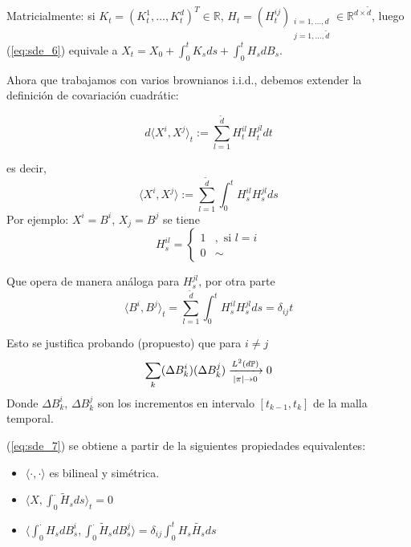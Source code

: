 Matricialmente: si $K_t = (K_t^1, \ldots, K_t^d)^T \in \mathbb{R}$, $H_t =
(H_t^{ij})_{\substack{i = 1,\ldots, d \\ j=1,\ldots,\tilde{d}}} \in \mathbb{R}^{d \times \tilde{d}}$, luego 
(\ref{eq:sde_6}) equivale a $X_t = X_0 + \int_{0}^{t} K_s ds + \int_{0}^{t} H_s dB_s$. 

Ahora que trabajamos con varios brownianos i.i.d., debemos extender la definición de covariación 
cuadrátic: 

\begin{equation*}
        d\langle X^{i}, X^{j} \rangle_t := \sum_{l=1}^{\tilde{d}} H_{t}^{il} H_{t}^{jl} dt
\end{equation*}

es decir, 
\begin{equation*}
        \label{eq:sde_7}        
        \tag{**}
\langle X^{i}, X^{j} \rangle := \sum_{l=1}^{\tilde{d}} \int_{0}^{t} H_{s}^{il} H_{s}^{jl} ds
\end{equation*}
 Por ejemplo: $X^i = B^i$, $X_j = B^j$ se tiene 
 \begin{equation*}
         H_{s}^{il} = 
         \begin{cases}
                 1 &, \text{ si } l=i \\
                 0 & \sim 
         \end{cases}
 \end{equation*}

Que opera de manera análoga para $H^{jl}_s$, por otra parte 
\begin{equation*}
        \langle B^i, B^j \rangle_t = \sum_{l=1}^{\tilde{d}} \int_{0}^{t} H_s^{il} H_s^{jl} ds = \delta_{ij} t 
\end{equation*}

Esto se justifica probando (propuesto) que para $i \neq j$ 
\begin{equation*}
        \sum_{k} (\Delta B_k^i)(\Delta B_k^j) \xrightarrow[\abs{\pi} \to 0]{L^2(d\mathbb{P})} 0
\end{equation*}
Donde $\Delta B_k^i$, $\Delta B_k^j$ son los incrementos en intervalo
$[t_{k-1}, t_{k}]$ de la malla temporal.

\begin{remark}
        (\ref{eq:sde_7}) se obtiene a partir de la siguientes propiedades equivalentes: 
        \begin{itemize}
                \item $\langle \cdot , \cdot  \rangle$ es bilineal y simétrica. 
                \item $\langle X, \int_{0}^{\cdot} \tilde{H}_s ds \rangle_t = 0$ 
                \item $\langle \int_{0}^{\cdot} H_s dB_s^i, \int_{0}^{\cdot } \tilde{H}_s dB_s^j \rangle 
                        = \delta_{ij} \int_0^t H_s \tilde{H_s} ds$
        \end{itemize}
\end{remark}

